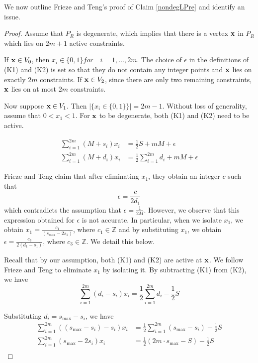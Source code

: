 \documentclass[10pt,a4paper]{amsart}
\def\ve#1{\mathchoice{\mbox{\boldmath$\displaystyle\bf#1$}}
{\mbox{\boldmath$\textstyle\bf#1$}}
{\mbox{\boldmath$\scriptstyle\bf#1$}}
{\mbox{\boldmath$\scriptscriptstyle\bf#1$}}}
\begin{document}
We now outline Frieze and Teng's proof of Claim \ref{nondegLPre} and identify an issue.
\begin{proof}
Assume that $P_R$ is degenerate, which implies that there is a vertex $\ve{x}$ in $P_R$ which lies on $2m+1$ active constraints.  

If $\ve{x} \in V_0$, then $x_i \in \{0,1\} for \quad i=1,\ldots, 2m$.  The choice of $\epsilon$ in the definitions of (K1) and (K2) is set so that they do not contain any integer points and $\ve{x}$ lies on exactly $2m$ constraints.
If $\ve{x} \in V_2$, since there are only two remaining constraints, $\ve{x}$ lies on at most $2m$ constraints.


Now suppose $\ve{x} \in V_1$.  Then $|\{x_i \in \{0,1\}\}| = 2m-1$. Without loss of generality, assume that $0< x_1<1 $. For $\ve{x}$ to be degenerate, both (K1) and (K2) need to be active. 

\begin{align*}
    \sum_{i=1}^{2m} (M + s_i) x_i &= \frac{1}{2}S + mM + \epsilon \tag{K1}\\ 
\sum_{i=1}^{2m} (M + d_i)x_i &= \frac{1}{2} \sum_{i=1}^{2m} d_i + mM + \epsilon \tag{K2}
\end{align*}

Frieze and Teng claim that after eliminating $x_1$, they obtain an integer $c$ such that $$\epsilon = \frac{c}{2d_1}$$ which contradicts the assumption that $\epsilon = \frac{1}{2M}$. However, we observe that this expression obtained for $\epsilon$ is not accurate. In particular, when we isolate $x_1$, we obtain $x_1 = \frac{c_1}{(s_{\max}-2s_1)}$, where $c_1 \in \mathbb{Z}$ and by substituting $x_1$, we obtain $\epsilon = \frac{c_3}{2(d_1 - s_1)}$, where $c_3 \in \mathbb{Z}$. We detail this below. 

Recall that by our assumption, both (K1) and (K2) are active at $\ve{x}$. We follow Frieze and Teng to eliminate $x_1$ by isolating it. By subtracting (K1) from (K2), we have 
$$\sum_{i=1}^{2m} (d_i - s_i)x_i = \frac{1}{2}\sum_{i=1}^{2m} d_i - \frac{1}{2}S$$

Substituting $d_i = s_{\max} - s_i$, we have
\begin{align*}
\sum_{i=1}^{2m} ((s_{\max} - s_i) - s_i)x_i &= \frac{1}{2}\sum_{i=1}^{2m} (s_{\max} - s_i) - \frac{1}{2}S \\
\sum_{i=1}^{2m} (s_{\max} - 2s_i)x_i &= \frac{1}{2}\left(2m\cdot s_{\max} - S\right) - \frac{1}{2}S \\
\end{align*}


\end{proof}
\end{document}
